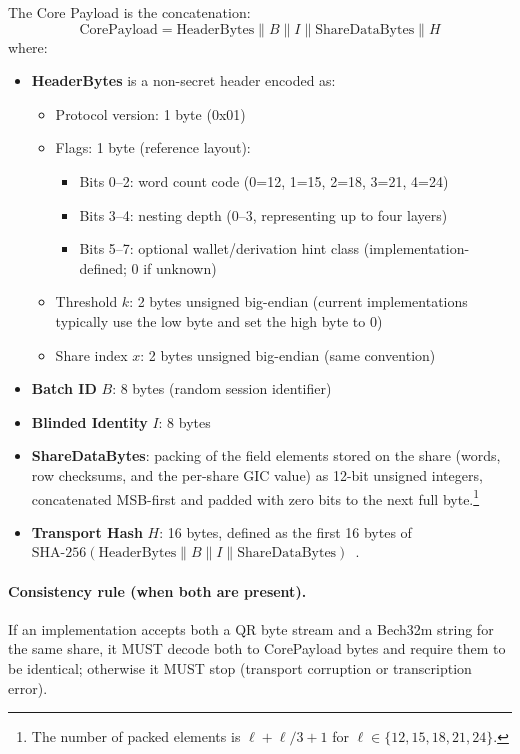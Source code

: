 \documentclass[11pt]{article}
\begin{document}
The Core Payload is the concatenation:
\[
\text{CorePayload} = \text{HeaderBytes} \parallel B \parallel I \parallel \text{ShareDataBytes} \parallel H
\]
where:
\begin{itemize}[noitemsep]
    \item \textbf{HeaderBytes} is a non-secret header encoded as:
    \begin{itemize}[noitemsep]
        \item Protocol version: 1 byte (0x01)
        \item Flags: 1 byte (reference layout):
        \begin{itemize}[noitemsep]
            \item Bits 0--2: word count code (0=12, 1=15, 2=18, 3=21, 4=24)
            \item Bits 3--4: nesting depth (0--3, representing up to four layers)
            \item Bits 5--7: optional wallet/derivation hint class (implementation-defined; 0 if unknown)
        \end{itemize}
        \item Threshold $k$: 2 bytes unsigned big-endian (current implementations typically use the low byte and set the high byte to 0)
        \item Share index $x$: 2 bytes unsigned big-endian (same convention)
    \end{itemize}
    \item \textbf{Batch ID} $B$: 8 bytes (random session identifier)
    \item \textbf{Blinded Identity} $I$: 8 bytes
    \item \textbf{ShareDataBytes}: packing of the field elements stored on the share (words, row checksums, and the per-share GIC value) as 12-bit unsigned integers, concatenated MSB-first and padded with zero bits to the next full byte.\footnote{The number of packed elements is $\ell + \ell/3 + 1$ for $\ell \in \{12,15,18,21,24\}$.}
    \item \textbf{Transport Hash} $H$: 16 bytes, defined as the first 16 bytes of $\text{SHA-256}(\text{HeaderBytes}\parallel B\parallel I\parallel \text{ShareDataBytes})$~\cite{fips1804}.
\end{itemize}

\paragraph{Consistency rule (when both are present).} If an implementation accepts both a QR byte stream and a Bech32m string for the same share, it MUST decode both to CorePayload bytes and require them to be identical; otherwise it MUST stop (transport corruption or transcription error).
\end{document}
